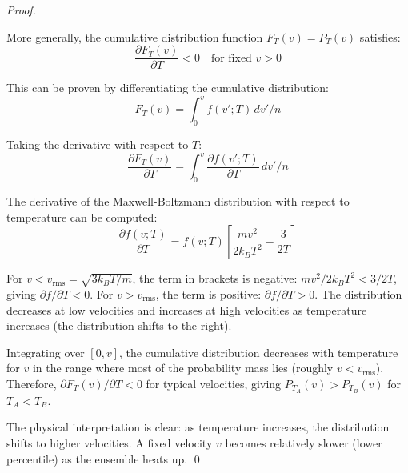 \documentclass[12pt,a4paper]{article}
\theoremstyle{definition}
\theoremstyle{remark}
\begin{document}
\begin{proof}
\begin{figure}[htbp]
\label{fig:velocity_temperature_noncorrespondence}
\end{figure}


More generally, the cumulative distribution function $F_T(v) = P_T(v)$ satisfies:
\begin{equation}
\frac{\partial F_T(v)}{\partial T} < 0 \quad \text{for fixed } v > 0
\label{eq:cdf_temperature_derivative}
\end{equation}

This can be proven by differentiating the cumulative distribution:
\begin{equation}
F_T(v) = \int_0^v f(v'; T) \, dv' / n
\end{equation}

Taking the derivative with respect to $T$:
\begin{equation}
\frac{\partial F_T(v)}{\partial T} = \int_0^v \frac{\partial f(v'; T)}{\partial T} \, dv' / n
\end{equation}

The derivative of the Maxwell-Boltzmann distribution with respect to temperature can be computed:
\begin{equation}
\frac{\partial f(v; T)}{\partial T} = f(v; T) \left[\frac{mv^2}{2k_B T^2} - \frac{3}{2T}\right]
\end{equation}

For $v < v_{\text{rms}} = \sqrt{3k_B T / m}$, the term in brackets is negative: $mv^2 / 2k_B T^2 < 3/2T$, giving $\partial f / \partial T < 0$. For $v > v_{\text{rms}}$, the term is positive: $\partial f / \partial T > 0$. The distribution decreases at low velocities and increases at high velocities as temperature increases (the distribution shifts to the right).

Integrating over $[0, v]$, the cumulative distribution decreases with temperature for $v$ in the range where most of the probability mass lies (roughly $v < v_{\text{rms}}$). Therefore, $\partial F_T(v) / \partial T < 0$ for typical velocities, giving $P_{T_A}(v) > P_{T_B}(v)$ for $T_A < T_B$.

The physical interpretation is clear: as temperature increases, the distribution shifts to higher velocities. A fixed velocity $v$ becomes relatively slower (lower percentile) as the ensemble heats up. \qed
\end{proof}
\end{document}
